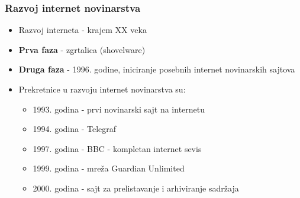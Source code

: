 \documentclass{beamer}
\begin{document}
\begin{frame}[fragile]\frametitle{Razvoj internet novinarstva}
\transboxin
	\begin{itemize}	
		\item Razvoj interneta - krajem XX veka
            \item {\bf Prva faza} - zgrtalica (shovelware)
            \item {\bf Druga faza} - 1996. godine, iniciranje posebnih internet novinarskih sajtova
            \item Prekretnice u razvoju internet novinarstva su:
            \begin{itemize}
            \item 1993. godina - prvi novinarski sajt na internetu
            \item 1994. godina - Telegraf
            \item 1997. godina - BBC - kompletan internet sevis
            \item 1999. godina - mreža Guardian Unlimited
            \item 2000. godina - sajt za prelistavanje i arhiviranje sadržaja
            \end{itemize}
	\end{itemize}
\end{frame}
\end{document}

